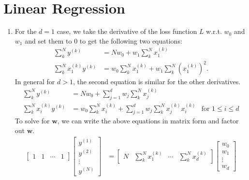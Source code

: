 

\renewcommand\arraystretch{0.8}



\section{Linear Regression}
\begin{enumerate}[label=(\alph*)]
	\item
	      For the $d = 1$ case, we take the derivative of the loss function $L$ w.r.t. $w_0$ and $w_1$ and set them to 0 to get
	      the following two equations:
	      \begin{align*}
		      \sum_k^N y^{(k)}           & = Nw_0 + w_1 \sum_k^N x_1^{(k)}                                     \\
		      \sum_k^N x_1^{(k)} y^{(k)} & = w_0 \sum_k^N x_1^{(k)} + w_1 \sum_k^N \left( x_1^{(k)} \right)^2.
	      \end{align*}
	      In general for $d > 1$, the second equation is similar for the other derivatives.
	      \begin{align*}
		      \sum_k^N y^{(k)}           & = Nw_0 + \sum_{j=1}^d w_j \sum_k^N x_j^{(k)}                                                         \\
		      \sum_k^N x_i^{(k)} y^{(k)} & = w_0 \sum_k^N x_i^{(k)} + \sum_{j=1}^d w_j \sum_k^N x_j^{(k)} x_i^{(k)} & \text{for } 1 \le i \le d
	      \end{align*}
	      To solve for $\bm{w}$, we can write the above equations in matrix form and factor out $\bm{w}$.
	      \begin{align*}
		      \begin{bmatrix}
			      1 & 1 & \cdots & 1
		      \end{bmatrix}
		      \begin{bmatrix}
			      y^{(1)} \\ y^{(2)} \\ \vdots \\ y^{(N)}
		      \end{bmatrix}
		       & =
		      \begin{bmatrix}
			      N & \sum_k^N x_1^{(k)} & \cdots & \sum_k^N x_d^{(k)}
		      \end{bmatrix}
		      \begin{bmatrix}
			      w_0 \\ w_1 \\ \vdots \\ w_d

\end{bmatrix}
\end{align*}
\end{enumerate}
